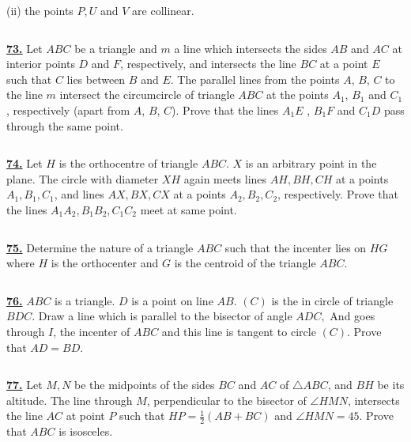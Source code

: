 \documentclass{article}
\begin{document}
(ii) the points $P, U$ and $V$ are collinear.


$$ $$

\href{http://www.artofproblemsolving.com/Forum/viewtopic.php?p=501529#p501529
 }{\bf 73.} Let $ABC$ be a triangle and $m$ a line which intersects the sides $AB$ and $AC$ at interior points $D$ and $F$, respectively, and intersects the line $BC$ at a point $E$ such that $C$ lies between $B$ and $E$. The parallel lines from the points $A$, $B$, $C$ to the line $m$ intersect the circumcircle of triangle $ABC$ at the points $A_1$, $B_1$  and $C_1$, respectively (apart from $A$, $B$, $C$). Prove that the lines $A_1E$ , $B_1F$  and  $C_1D$  pass through the same point.

$$ $$


\href{ http://www.artofproblemsolving.com/Forum/viewtopic.php?p=457871#p457871
}{\bf 74.} Let $H$ is the orthocentre of triangle $ABC$. $X$ is an arbitrary point in the plane. The circle with diameter $XH$ again meets lines $AH, BH, CH$ at a points $A_1, B_1, C_1$, and  lines $AX, BX, CX$ at a points $A_2, B_2, C_2$, respectively.  Prove that the lines $A_1A_2, B_1B_2, C_1C_2$ meet at same point.

$$ $$


\href{ http://www.artofproblemsolving.com/Forum/viewtopic.php?p=279551#p279551
}{\bf 75.} Determine the nature of a triangle $ABC$ such that the incenter lies on $HG$ where $H$ is the orthocenter and $G$
 is the centroid of the triangle $ABC$.

$$ $$


\href{http://www.artofproblemsolving.com/Forum/viewtopic.php?p=330584#p330584
 }{\bf 76.} $ABC$ is a triangle. $D$ is a point on line $AB.$ $(C)$ is the in circle of triangle $BDC$. Draw a line which is parallel to the bisector of angle $ADC,$ And goes through $I$, the incenter of $ABC$ and this line is tangent to circle $(C)$. Prove that $AD=BD.$

$$ $$


\href{ http://www.artofproblemsolving.com/Forum/viewtopic.php?p=347135#p347135
}{\bf 77.} Let $M, N$ be the midpoints of the sides $BC$ and $AC$ of $\triangle ABC$, and $BH$ be its altitude. The line through $M$, perpendicular to the bisector of $\angle HMN$, intersects the line $AC$ at point $P$ such that $HP = \frac{1}{2}(AB+BC)$ and $\angle HMN = 45$. Prove that $ABC$ is isosceles.






$$ $$
\end{document}
